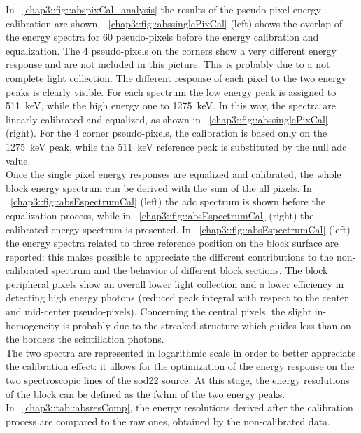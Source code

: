 In \figurename~\ref{chap3::fig::abspixCal_analysis} the results of the pseudo-pixel energy calibration are shown. \figurename~\ref{chap3::fig::abssinglePixCal} (left) shows the overlap of the energy spectra for 60 pseudo-pixels before the energy calibration and equalization. The 4 pseudo-pixels on the corners show a very different energy response and are not included in this picture. This is probably due to a not complete light collection. The different response of each pixel to the two energy peaks is clearly visible. For each spectrum the low energy peak is assigned to 511~keV, while the high energy one to 1275~keV. In this way, the spectra are linearly calibrated and equalized, as shown in \figurename~\ref{chap3::fig::abssinglePixCal} (right). For the 4 corner pseudo-pixels, the calibration is based only on the 1275~keV peak, while the 511~keV reference peak is substituted by the null \gls{adc} value.\\
Once the single pixel energy responses are equalized and calibrated, the whole block energy spectrum can be derived with the sum of the all pixels. In \figurename~\ref{chap3::fig::absEspectrumCal} (left) the \gls{adc} spectrum is shown before the equalization process, while in \figurename~\ref{chap3::fig::absEspectrumCal} (right) the calibrated energy spectrum is presented. In \figurename~\ref{chap3::fig::absEspectrumCal} (left) the energy spectra related to three reference position on the block surface are reported: this makes possible to appreciate  the different contributions to the non-calibrated spectrum and the behavior of different block sections. The block peripheral pixels show an overall lower light collection and a lower efficiency in detecting high energy photons (reduced peak integral with respect to the center and mid-center pseudo-pixels). Concerning the central pixels, the slight in-homogeneity is probably due to the streaked structure which guides less than on the borders the scintillation photons.\\
The two spectra are represented in logarithmic scale in order to better appreciate the calibration effect: it allows for the optimization of the energy response on the two spectroscopic lines of the \gls{sod22} source. At this stage, the energy resolutions of the block can be defined as the \gls{fwhm} of the two energy peaks.\\
In \tablename~\ref{chap3::tab::absresComp}, the energy resolutions derived after the calibration process are compared to the raw ones, obtained by the non-calibrated data.



